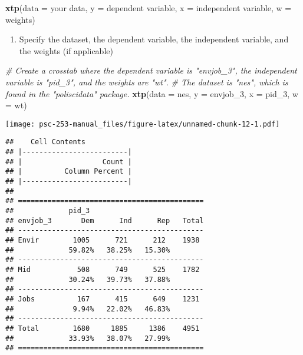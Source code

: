 \documentclass[]{book}
\newenvironment{Shaded}{\begin{snugshade}}{\end{snugshade}}
\newcommand{\KeywordTok}[1]{\textcolor[rgb]{0.13,0.29,0.53}{\textbf{{#1}}}}
\newcommand{\DataTypeTok}[1]{\textcolor[rgb]{0.13,0.29,0.53}{{#1}}}
\newcommand{\CommentTok}[1]{\textcolor[rgb]{0.56,0.35,0.01}{\textit{{#1}}}}
\newcommand{\NormalTok}[1]{{#1}}
\providecommand{\tightlist}{%
  \setlength{\itemsep}{0pt}\setlength{\parskip}{0pt}}
\begin{document}
\begin{Shaded}
\begin{Highlighting}[]
\KeywordTok{xtp}\NormalTok{(}\DataTypeTok{data =} \NormalTok{your data, }\DataTypeTok{y =} \NormalTok{dependent variable, }\DataTypeTok{x =} \NormalTok{independent variable, }\DataTypeTok{w =} \NormalTok{weights)}
\end{Highlighting}
\end{Shaded}

\begin{enumerate}
\def\labelenumi{\arabic{enumi}.}
\tightlist
\item
  Specify the dataset, the dependent variable, the independent variable,
  and the weights (if applicable)
\end{enumerate}

\begin{Shaded}
\begin{Highlighting}[]
\CommentTok{# Create a crosstab where the dependent variable is "envjob_3", the independent variable is "pid_3", and the weights are "wt".}
\CommentTok{# The dataset is "nes", which is found in the "poliscidata" package.}
\KeywordTok{xtp}\NormalTok{(}\DataTypeTok{data =} \NormalTok{nes, }\DataTypeTok{y =} \NormalTok{envjob_3, }\DataTypeTok{x =} \NormalTok{pid_3, }\DataTypeTok{w =} \NormalTok{wt)}
\end{Highlighting}
\end{Shaded}

\texttt{[image: psc-253-manual\_files/figure-latex/unnamed-chunk-12-1.pdf]}

\begin{verbatim}
##    Cell Contents 
## |-------------------------|
## |                   Count | 
## |          Column Percent | 
## |-------------------------|
## 
## ============================================
##             pid_3
## envjob_3       Dem      Ind      Rep   Total
## --------------------------------------------
## Envir        1005      721      212    1938 
##             59.82%   38.25%   15.30%        
## --------------------------------------------
## Mid           508      749      525    1782 
##             30.24%   39.73%   37.88%        
## --------------------------------------------
## Jobs          167      415      649    1231 
##              9.94%   22.02%   46.83%        
## --------------------------------------------
## Total        1680     1885     1386    4951 
##             33.93%   38.07%   27.99%        
## ============================================
\end{verbatim}
\end{document}
